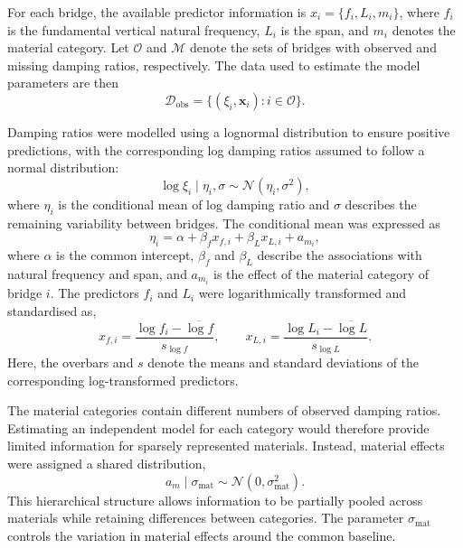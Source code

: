 \documentclass[preprint,a4paper,12pt]{elsarticle}
\begin{document}
For each bridge, the available predictor information is \({x}_i=\{f_i,L_i,m_i\}\), where $f_i$ is the fundamental vertical natural frequency, $L_i$ is the span, and $m_i$ denotes the material category.
Let $\mathcal{O}$ and $\mathcal{M}$ denote the sets of bridges
with observed and missing damping ratios, respectively.
The data used to estimate the model parameters are then
\begin{equation}
    \mathcal{D}_{\mathrm{obs}}
    = \{(\xi_i,\mathbf{x}_i):i\in\mathcal{O}\}.
\end{equation}

Damping ratios were modelled using a lognormal distribution to ensure positive predictions, with the corresponding log damping ratios assumed to follow a normal distribution:
\begin{equation}
    \log\xi_i \mid \eta_i,\sigma
    \sim \mathcal{N}(\eta_i,\sigma^2),
\end{equation}
where $\eta_i$ is the conditional mean of log damping ratio and $\sigma$ describes the remaining variability between bridges.
The conditional mean was expressed as
\begin{equation}
    \eta_i =
    \alpha+\beta_f x_{f,i}+\beta_L x_{L,i}+a_{m_i},
\end{equation}
where $\alpha$ is the common intercept, $\beta_f$ and $\beta_L$ describe the associations with natural frequency and span, and $a_{m_i}$ is the effect of the material category of bridge $i$.
The predictors $f_i$ and $L_i$ were logarithmically transformed and standardised as,
\begin{equation}
    x_{f,i} =
    \frac{\log f_i-\overline{\log f}}{s_{\log f}},
    \qquad
    x_{L,i} =
    \frac{\log L_i-\overline{\log L}}{s_{\log L}}.
\end{equation}
Here, the overbars and $s$ denote the means and standard deviations of the corresponding log-transformed predictors.

The material categories contain different numbers of observed damping ratios.
Estimating an independent model for each category would therefore provide limited information for sparsely represented materials.
Instead, material effects were assigned a shared distribution,
\begin{equation}
    a_m \mid \sigma_{\mathrm{mat}}
    \sim \mathcal{N}(0,\sigma_{\mathrm{mat}}^2).
\end{equation}
This hierarchical structure allows information to be partially pooled across materials while retaining differences between categories.
The parameter $\sigma_{\mathrm{mat}}$ controls the variation in material effects around the common baseline.
\end{document}
